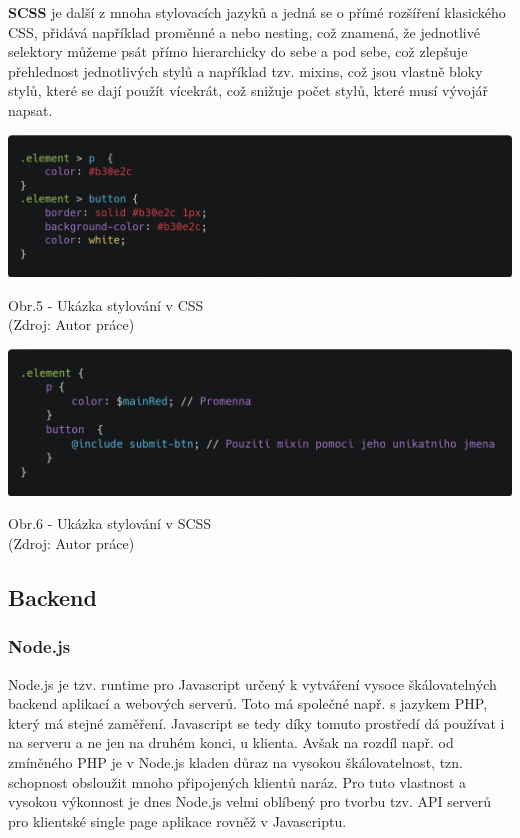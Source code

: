 \documentclass[12pt,a4paper]{report}
\begin{document}
  \textbf{SCSS} je další z mnoha stylovacích jazyků a jedná se o přímé rozšíření klasického CSS, přidává
  například proměnné a nebo nesting, což znamená, že jednotlivé selektory můžeme psát přímo
  hierarchicky do sebe a pod sebe, což zlepšuje přehlednost jednotlivých stylů a například tzv.
  mixins, což jsou vlastně bloky stylů, které se dají použít vícekrát, což snižuje počet stylů, které musí
  vývojář napsat.
  
  \vspace*{0.5cm}
  \noindent\includegraphics[width=\linewidth]{cssCodeblock.png}
  \begin{center}
    Obr.5 - Ukázka stylování v CSS  \\
    (Zdroj: Autor práce)
  \end{center}

  \vspace*{0.5cm}\vspace*{0.5cm}
  \noindent\includegraphics[width=\linewidth]{scssCodeblock.png}
  \begin{center}
    Obr.6 -  Ukázka stylování v SCSS  \\
    (Zdroj: Autor práce)
  \end{center}
  \vspace*{0.5cm}

  \subsection{Backend}
  \subsubsection{Node.js}
  Node.js je tzv. runtime pro Javascript určený k vytváření vysoce škálovatelných backend aplikací a
  webových serverů. Toto má společné např. s jazykem PHP, který má stejné zaměření. Javascript se
  tedy díky tomuto prostředí dá používat i na serveru a ne jen na druhém konci, u klienta. Avšak na
  rozdíl např. od zmíněného PHP je v Node.js kladen důraz na vysokou škálovatelnost, tzn.
  schopnost obsloužit mnoho připojených klientů naráz. Pro tuto vlastnost a vysokou výkonnost je
  dnes Node.js velmi oblíbený pro tvorbu tzv. API serverů pro klientské single page aplikace rovněž v
  Javascriptu. 
\end{document}
